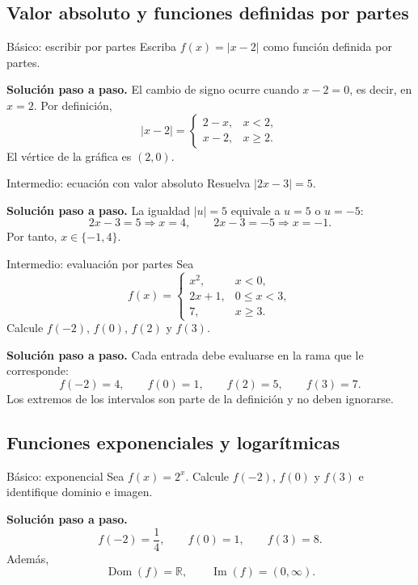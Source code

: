 \documentclass[aspectratio=169,10pt]{beamer}
\newcommand{\R}{\mathbb{R}}
\newcommand{\Dom}{\operatorname{Dom}}
\newcommand{\Ima}{\operatorname{Im}}
\begin{document}
\subsection{Valor absoluto y funciones definidas por partes}

\begin{frame}{Básico: escribir por partes}
Escriba $f(x)=|x-2|$ como función definida por partes.

\textbf{Solución paso a paso.} El cambio de signo ocurre cuando $x-2=0$, es decir, en $x=2$. Por definición,
\[
\boxed{
|x-2|=
\begin{cases}
2-x,&x<2,\\
x-2,&x\ge2.
\end{cases}}
\]
El vértice de la gráfica es $(2,0)$.
\end{frame}

\begin{frame}{Intermedio: ecuación con valor absoluto}
Resuelva $|2x-3|=5$.

\textbf{Solución paso a paso.} La igualdad $|u|=5$ equivale a $u=5$ o $u=-5$:
\[
2x-3=5\Longrightarrow x=4,
\qquad
2x-3=-5\Longrightarrow x=-1.
\]
Por tanto, $\boxed{x\in\{-1,4\}}$.
\end{frame}

\begin{frame}{Intermedio: evaluación por partes}
Sea
\[
f(x)=\begin{cases}
x^2,&x<0,\\
2x+1,&0\le x<3,\\
7,&x\ge3.
\end{cases}
\]
Calcule $f(-2)$, $f(0)$, $f(2)$ y $f(3)$.

\textbf{Solución paso a paso.} Cada entrada debe evaluarse en la rama que le corresponde:
\[
f(-2)=4,\qquad f(0)=1,\qquad f(2)=5,\qquad f(3)=7.
\]
Los extremos de los intervalos son parte de la definición y no deben ignorarse.
\end{frame}

\subsection{Funciones exponenciales y logarítmicas}

\begin{frame}{Básico: exponencial}
Sea $f(x)=2^x$. Calcule $f(-2)$, $f(0)$ y $f(3)$ e identifique dominio e imagen.

\textbf{Solución paso a paso.}
\[
f(-2)=\frac14,\qquad f(0)=1,\qquad f(3)=8.
\]
Además,
\[
\boxed{\Dom(f)=\R,\qquad \Ima(f)=(0,\infty)}.
\]
\end{frame}
\end{document}
